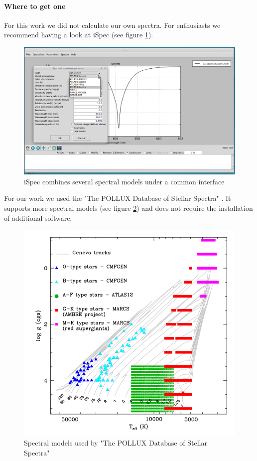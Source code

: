 \documentclass[10pt,a4paper,notitlepage,twocolumn]{article}
\begin{document}
\paragraph{Where to get one}
For this work we did not calculate our own spectra.
For enthusiasts we recommend having a look at iSpec \cite{BlancoCuaresmaSoubiranHeiter2014} (see figure \ref{fig:iSpec}).
\begin{figure}[h]
	\includegraphics[width=\columnwidth]{img/iSpec.png}
	\caption{iSpec combines several spectral models under a common interface \cite{BlancoCuaresmaSoubiranHeiter2014}}
	\label{fig:iSpec}
\end{figure}

For our work we used the "The POLLUX Database of Stellar Spectra" \cite{Pollux2010}. It supports more spectral models (see figure \ref{fig:pollux}) and does not require the installation of additional software.
\begin{figure}[h]
	\includegraphics[width=\columnwidth]{img/pollux_models.png}
	\caption{Spectral models used by "The POLLUX Database of Stellar Spectra" \cite{Pollux2010}}
	\label{fig:pollux}
\end{figure}
\end{document}

